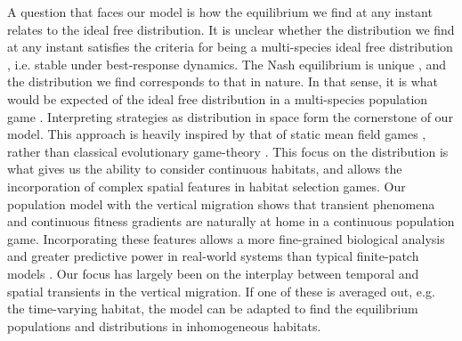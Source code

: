 A question that faces our model is how the equilibrium we find at any instant relates to the ideal free distribution. It is unclear whether the distribution we find at any instant satisfies the criteria for being a multi-species ideal free distribution \citep{kvrivan2008ideal}, i.e. stable under best-response dynamics. The Nash equilibrium is unique \citep{verticalmigration}, and the distribution we find corresponds to that in nature. In that sense, it is what would be expected of the ideal free distribution in a multi-species population game \citep{cressman2004ideal}.
Interpreting strategies as distribution in space form the cornerstone of our model. This approach is heavily inspired by that of static mean field games \citep{lasry2007mean, blanchet2016optimal}, rather than classical evolutionary game-theory \cite{hofbauer1998evolutionary}. This focus on the distribution is what gives us the ability to consider continuous habitats, and allows the incorporation of complex spatial features in habitat selection games. Our population model with the vertical migration shows that transient phenomena and continuous fitness gradients \citep{kawecki2004conceptual} are naturally at home in a continuous population game. Incorporating these features allows a more fine-grained biological analysis and greater predictive power in real-world systems than typical finite-patch models \citep{kvrivan2008ideal, sadowski2019predator}. Our focus has largely been on the interplay between temporal and spatial transients in the vertical migration. If one of these is averaged out, e.g. the time-varying habitat, the model can be adapted to find the equilibrium populations and distributions in inhomogeneous habitats.







